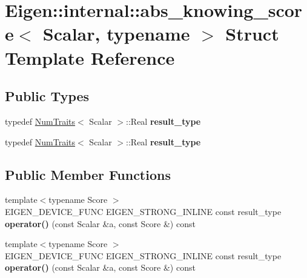 \hypertarget{struct_eigen_1_1internal_1_1abs__knowing__score}{}\section{Eigen\+:\+:internal\+:\+:abs\+\_\+knowing\+\_\+score$<$ Scalar, typename $>$ Struct Template Reference}
\label{struct_eigen_1_1internal_1_1abs__knowing__score}
\subsection*{Public Types}
\begin{DoxyCompactItemize}
\item 
\mbox{\label{struct_eigen_1_1internal_1_1abs__knowing__score_a5e8bf72072f7610591df4e9b6eaf25a5}} 
typedef \hyperlink{group___core___module_struct_eigen_1_1_num_traits}{Num\+Traits}$<$ Scalar $>$\+::Real {\bfseries result\+\_\+type}
\item 
\mbox{\label{struct_eigen_1_1internal_1_1abs__knowing__score_a5e8bf72072f7610591df4e9b6eaf25a5}} 
typedef \hyperlink{group___core___module_struct_eigen_1_1_num_traits}{Num\+Traits}$<$ Scalar $>$\+::Real {\bfseries result\+\_\+type}
\end{DoxyCompactItemize}
\subsection*{Public Member Functions}
\begin{DoxyCompactItemize}
\item 
\mbox{\label{struct_eigen_1_1internal_1_1abs__knowing__score_ae43aa25e52af13ab934224535a1606e2}} 
{\footnotesize template$<$typename Score $>$ }\\E\+I\+G\+E\+N\+\_\+\+D\+E\+V\+I\+C\+E\+\_\+\+F\+U\+NC E\+I\+G\+E\+N\+\_\+\+S\+T\+R\+O\+N\+G\+\_\+\+I\+N\+L\+I\+NE const result\+\_\+type {\bfseries operator()} (const Scalar \&a, const Score \&) const
\item 
\mbox{\label{struct_eigen_1_1internal_1_1abs__knowing__score_ae43aa25e52af13ab934224535a1606e2}} 
{\footnotesize template$<$typename Score $>$ }\\E\+I\+G\+E\+N\+\_\+\+D\+E\+V\+I\+C\+E\+\_\+\+F\+U\+NC E\+I\+G\+E\+N\+\_\+\+S\+T\+R\+O\+N\+G\+\_\+\+I\+N\+L\+I\+NE const result\+\_\+type {\bfseries operator()} (const Scalar \&a, const Score \&) const
\end{DoxyCompactItemize}


